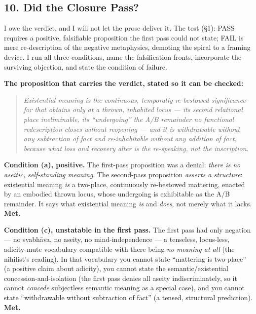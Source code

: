\documentclass[11pt]{article}
\begin{document}
\subsection*{10. Did the Closure Pass?}

I owe the verdict, and I will not let the prose deliver it. The test (§1): PASS requires a positive, falsifiable proposition the first pass could not state; FAIL is mere re-description of the negative metaphysics, demoting the spiral to a framing device. I run all three conditions, name the falsification fronts, incorporate the surviving objection, and state the condition of failure.

\textbf{The proposition that carries the verdict, stated so it can be checked:}

\begin{quote}
\emph{Existential meaning is the continuous, temporally re-bestowed significance-for that obtains only at a thrown, inhabited locus — its second relational place ineliminable, its ``undergoing'' the A/\allowbreak{}B remainder no functional redescription closes without reopening — and it is withdrawable without any subtraction of fact and re-inhabitable without any addition of fact, because what loss and recovery alter is the re-speaking, not the inscription.}
\end{quote}

\textbf{Condition (a), positive.} The first-pass proposition was a denial: \emph{there is no aseitic, self-standing meaning}. The second-pass proposition \emph{asserts a structure}: existential meaning \emph{is} a two-place, continuously re-bestowed mattering, enacted by an embodied thrown locus, whose undergoing is exhibitable as the A/\allowbreak{}B remainder. It says what existential meaning \emph{is} and \emph{does}, not merely what it lacks. \textbf{Met.}

\textbf{Condition (c), unstatable in the first pass.} The first pass had only negation — no svabhāva, no aseity, no mind-independence — a tenseless, locus-less, adicity-mute vocabulary compatible with there being \emph{no meaning at all} (the nihilist's reading). In that vocabulary you cannot state ``mattering is two-place'' (a positive claim about adicity), you cannot state the semantic/\allowbreak{}existential concession-and-isolation (the first pass denies all aseity indiscriminately, so it cannot \emph{concede} subjectless semantic meaning as a special case), and you cannot state ``withdrawable without subtraction of fact'' (a tensed, structural prediction). \textbf{Met.}
\end{document}
